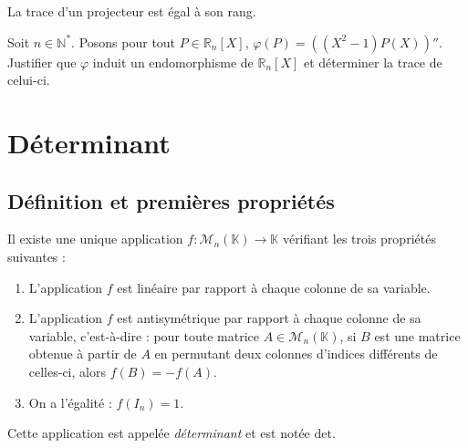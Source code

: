 \documentclass[a4paper,10pt]{report}
\begin{document}
\medskip

\begin{Exemple} La trace d'un projecteur est égal à son rang.

\vspace{5cm}
\medskip

\end{Exemple}

\begin{ApplicationDirecte} Soit $n \in \mathbb{N}^*$. Posons pour tout $P \in \mathbb{R}_n[X]$, $\varphi(P) = ((X^2-1)P(X))''$. Justifier que $\varphi$ induit un endomorphisme de $\mathbb{R}_n[X]$ et déterminer la trace de celui-ci.
\end{ApplicationDirecte}

\section{Déterminant}

\subsection{Définition et premières propriétés}

\begin{Definition}{} Il existe une unique application $f : \mathcal{M}_n(\mathbb{K}) \rightarrow \mathbb{K}$ vérifiant les trois propriétés suivantes :

\begin{enumerate}
\item L'application $f$ est linéaire par rapport à chaque colonne de sa variable.
\item L'application $f$ est antisymétrique par rapport à chaque colonne de sa variable, c'est-à-dire : pour toute matrice $A \in \mathcal{M}_n(\mathbb{K})$, si $B$ est une matrice obtenue à partir de $A$ en permutant deux colonnes d'indices différents de celles-ci, alors $f(B)=-f(A)$.
\item On a l'égalité : $f(I_n)=1$.
\end{enumerate}

Cette application est appelée \emph{déterminant} et est notée $\textrm{det}$.
\end{Definition}
\end{document}
